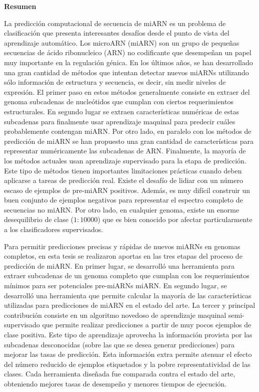 \newpage
\thispagestyle{empty}

\vspace{3cm}
\begin{center}
{\huge \textbf{Resumen}}
\end{center}
\vspace{1cm}

La predicción computacional de secuencia de miARN es un problema de clasificación que presenta interesantes desafíos desde el punto de vista del aprendizaje
automático. Los microARN (miARN) son un grupo de pequeñas secuencias de ácido ribonucleico (ARN) no codificante que desempeñan un papel muy importante en la
regulación génica. En los últimos años, se han desarrollado una gran cantidad de métodos que intentan detectar nuevos miARNs utilizando sólo información de
estructura y secuencia, es decir, sin medir niveles de expresión. El primer paso en estos métodos generalmente consiste en extraer del genoma subcadenas de
nucleótidos que cumplan con ciertos requerimientos estructurales. En segundo lugar se extraen características numéricas de estas subcadenas para finalmente usar
aprendizaje maquinal para predecir cuáles probablemente contengan miARN. Por otro lado, en paralelo con los métodos de predicción de miARN se han propuesto una
gran cantidad de características para representar numéricamente las subcadenas de ARN. Finalmente, la mayoría de los métodos actuales usan aprendizaje
supervisado para la etapa de predicción. Este tipo de métodos tienen importantes limitaciones prácticas cuando deben aplicarse a tareas de predicción real.
Existe el desafío de lidiar con un número escaso de ejemplos de pre-miARN positivos. Además, es muy difícil construir un buen conjunto de ejemplos negativos
para representar el espectro completo de secuencias no miARN. Por otro lado, en cualquier genoma, existe un enorme desequilibrio de clase ($1:10000$) que es
bien conocido por afectar particularmente a los clasificadores supervisados.

Para permitir predicciones precisas y rápidas de nuevos miARNs en genomas completos, en esta tesis se realizaron aportas en las tres etapas del proceso de
predicción de miARN.  En primer lugar, se desarrolló una herramienta para extraer subcadenas de un genoma completo que cumplan con los requerimientos mínimos
para ser potenciales pre-miARNs miARN. En segundo lugar, se desarrolló una herramienta que permite calcular la mayoría de las características utilizadas para
predicciones de miARN en el estado del arte. La tercer y principal contribución consiste en un algoritmo novedoso de aprendizaje maquinal semi-supervisado que
permite realizar predicciones a partir de muy pocos ejemplos de clase positiva. Este tipo de aprendizaje aprovecha la información provista por las subcadenas
desconocidas (sobre las que se desea generar predicciones) para mejorar las tasas de predicción. Esta información extra permite atenuar el efecto del número
reducido de ejemplos etiquetados y la pobre representatividad de las clases. Cada herramienta diseñada fue comparada contra el estado del arte, obteniendo
mejores tasas de desempeño y menores tiempos de ejecución.

\newpage
\thispagestyle{empty}
